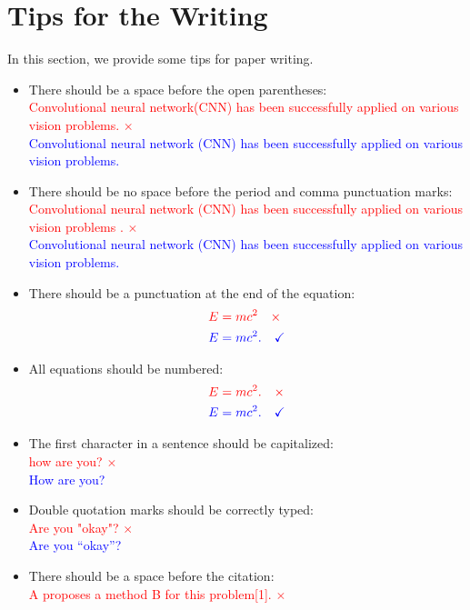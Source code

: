 \documentclass[10pt,twocolumn,letterpaper]{article}
\newcommand{\correct}[1]{\textcolor{blue}{#1 \checkmark}}
\newcommand{\wrong}[1]{\textcolor{red}{#1 $\times$}}
\begin{document}
\section{Tips for the Writing}
In this section, we provide some tips for paper writing. 
\begin{itemize}
    \item There should be a space before the open parentheses:\\
        \wrong{Convolutional neural network(CNN) has been successfully applied on various vision problems.}\\
        \correct{Convolutional neural network (CNN) has been successfully applied on various vision problems.}
    \item There should be no space before the period and comma punctuation marks:\\
        \wrong{Convolutional neural network (CNN) has been successfully applied on various vision problems .}\\
        \correct{Convolutional neural network (CNN) has been successfully applied on various vision problems.}
    \item There should be a punctuation at the end of the equation:
        \begin{align}
            \label{eq:eq1}
            & \textcolor{red}{E = mc^2 \quad \times} \\
            & \textcolor{blue}{E = mc^2. \quad \checkmark}
        \end{align}
    \item All equations should be numbered:
        \begin{align}
            \label{eq:eq2} \nonumber
            & \textcolor{red}{E = mc^2. \quad \times}\\ 
            & \textcolor{blue}{E = mc^2. \quad \checkmark}
        \end{align}
    \item The first character in a sentence should be capitalized:\\
        \wrong{how are you?}\\
        \correct{How are you?}
    \item Double quotation marks should be correctly typed:\\
        \wrong{Are you "okay"?}\\
        \correct{Are you ``okay''?}
    \item There should be a space before the citation:\\
        \wrong{A proposes a method B for this problem[1].}\\

\end{itemize}
\end{document}
